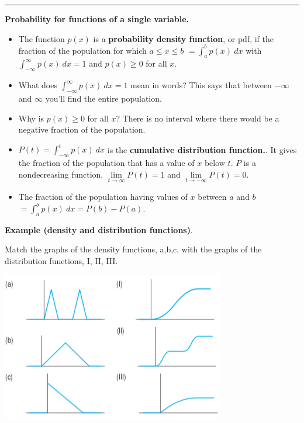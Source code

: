 \documentclass[12pt,letterpaper,noanswers]{exam}
\begin{document}
\vspace{0.2cm}
\hrule
\vspace{0.2cm}

\eject

\noindent\textbf{Probability for functions of a single variable.}
\begin{tcolorbox}
\begin{itemize}
\itemsep0em
    \item The function $p(x)$ is a \textbf{probability density function}, or pdf, if the fraction of the population for which $a\leq x\leq b$ $\displaystyle= \int_a^b p(x)\ dx$ with $\displaystyle\int_{-\infty}^{\infty}p(x)\ dx = 1$ and $p(x)\geq 0$ for all $x$.
    \item What does $\displaystyle\int_{-\infty}^{\infty}p(x)\ dx = 1$ mean in words?  This says that between $-\infty$ and $\infty$ you'll find the entire population.
    \item Why is $p(x)\geq 0$ for all $x$?  There is no interval where there would be a negative fraction of the population.
    \item $\displaystyle P(t) = \int_{-\infty}^t p(x)\ dx$ is the \textbf{cumulative distribution function.}. It gives the fraction of the population that has a value of $x$ below $t$.  $P$ is a nondecreasing function.  $\lim\limits_{t\rightarrow\infty} P(t) = 1$ and $\lim\limits_{t\rightarrow -\infty} P(t) = 0$.
    \item The fraction of the population having values of $x$ between $a$ and $b$ $\displaystyle= \int_a^b p(x)\ dx = P(b)-P(a)$.
\end{itemize}
\end{tcolorbox}



\noindent\textbf{Example (density and distribution functions)}. 

Match the graphs of the density functions, a,b,c, with the graphs of the distribution functions, I, II, III.  %

\includegraphics{img/C20p9.png}
\vfill
\end{document}
